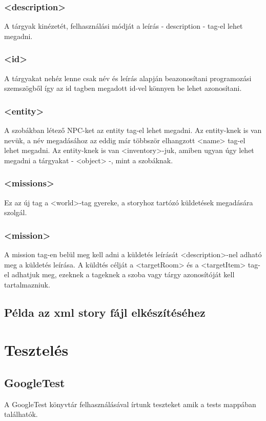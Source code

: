 \documentclass{scrarticle}
\begin{document}
\subsubsection{<description>}
A tárgyak kinézetét, felhasználási módját a leírás - description - tag-el lehet megadni.

\subsubsection{<id>}
A tárgyakat nehéz lenne csak név és leírás alapján beazonosítani programozási szemszögből így az id tagben megadott id-vel könnyen be lehet azonosítani.

\subsubsection{<entity>}
A szobákban létező NPC-ket az entity tag-el lehet megadni. Az entity-knek is van nevük, a név megadásához az eddig már többször elhangzott <name> tag-el lehet megadni. Az entity-knek is van <inventory>-juk, amiben ugyan úgy lehet megadni a tárgyakat - <object> -, mint a szobáknak.

\subsubsection{<missions>}
Ez az új tag a <world>-tag gyereke, a storyhoz tartózó küldetések megadására szolgál.

\subsubsection{<mission>}
A mission tag-en belül meg kell adni a küldetés leírását <description>-nel adható meg a küldetés leírása. A küldtés célját a <targetRoom> és a <targetItem> tag-el adhatjuk meg, ezeknek a tageknek a szoba vagy tárgy azonosítóját kell tartalmazniuk.

\subsection{Példa az xml story fájl elkészítéséhez}


\section{Tesztelés}
\subsection{GoogleTest}
A GoogleTest könyvtár felhasználásával írtunk teszteket amik a tests mappában találhatók.
\end{document}
